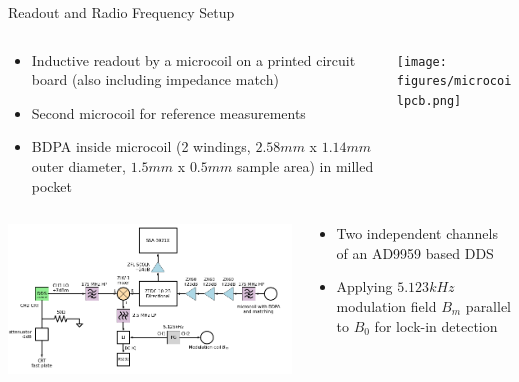 \documentclass[final]{beamer}
\begin{document}
\begin{frame}[fragile]{}
\begin{columns}[T]
\begin{column}{.49\linewidth}
      \begin{block}{\Large Readout and Radio Frequency Setup}
        \begin{columns}
          \begin{column}{0.6\columnwidth}
            \begin{itemize}
              \item Inductive readout by a microcoil on a printed circuit
                board (also including impedance match)
              \item Second microcoil for reference measurements
              \item BDPA inside microcoil (2 windings, $2.58mm$ x $1.14mm$
                    outer diameter, $1.5mm$ x $0.5mm$ sample area) in milled pocket
            \end{itemize}
          \end{column}
          \begin{column}{0.4\columnwidth}

            \texttt{[image: figures/microcoilpcb.png]}
          \end{column}
        \end{columns}

        \begin{columns}
          \begin{column}{0.6\columnwidth}
            \includegraphics[width=\columnwidth]{figures/rfsetup.png}
          \end{column}
          \begin{column}{0.4\columnwidth}
            \begin{itemize}
              \item Two independent channels of an AD9959 based DDS
              \item Applying $5.123 kHz$ modulation field $B_m$ parallel to $B_0$
                for lock-in detection
            \end{itemize}
          \end{column}
        \end{columns}
      \end{block}
  

\end{column}
\end{columns}
\end{frame}
\end{document}
